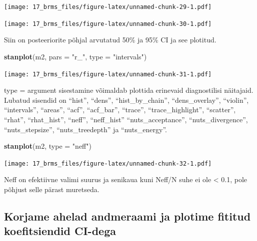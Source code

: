 \documentclass[]{book}
\newenvironment{Shaded}{\begin{snugshade}}{\end{snugshade}}
\newcommand{\DataTypeTok}[1]{\textcolor[rgb]{0.13,0.29,0.53}{#1}}
\newcommand{\KeywordTok}[1]{\textcolor[rgb]{0.13,0.29,0.53}{\textbf{#1}}}
\newcommand{\NormalTok}[1]{#1}
\newcommand{\OperatorTok}[1]{\textcolor[rgb]{0.81,0.36,0.00}{\textbf{#1}}}
\newcommand{\StringTok}[1]{\textcolor[rgb]{0.31,0.60,0.02}{#1}}
\begin{document}
\texttt{[image: 17\_brms\_files/figure-latex/unnamed-chunk-29-1.pdf]}

\begin{Shaded}
\end{Shaded}

\texttt{[image: 17\_brms\_files/figure-latex/unnamed-chunk-30-1.pdf]}

Siin on posteeriorite põhjal arvutatud 50\% ja 95\% CI ja see plotitud.

\begin{Shaded}
\begin{Highlighting}[]
\KeywordTok{stanplot}\NormalTok{(m2, }\DataTypeTok{pars =} \StringTok{"r_"}\NormalTok{, }\DataTypeTok{type =} \StringTok{"intervals"}\NormalTok{)}
\end{Highlighting}
\end{Shaded}

\texttt{[image: 17\_brms\_files/figure-latex/unnamed-chunk-31-1.pdf]}

type = argument sisestamine võimaldab plottida erinevaid diagnostilisi näitajaid. Lubatud sisendid on ``hist'', ``dens'', ``hist\_by\_chain'', ``dens\_overlay'', ``violin'', ``intervals'', ``areas'', ``acf'', ``acf\_bar'', ``trace'', ``trace\_highlight'', ``scatter'', ``rhat'', ``rhat\_hist'', ``neff'', ``neff\_hist'' ``nuts\_acceptance'', ``nuts\_divergence'', ``nuts\_stepsize'', ``nuts\_treedepth'' ja ``nuts\_energy''.

\begin{Shaded}
\begin{Highlighting}[]
\KeywordTok{stanplot}\NormalTok{(m2, }\DataTypeTok{type =} \StringTok{"neff"}\NormalTok{)}
\end{Highlighting}
\end{Shaded}

\texttt{[image: 17\_brms\_files/figure-latex/unnamed-chunk-32-1.pdf]}

Neff on efektiivne valimi suurus ja senikaua kuni Neff/N suhe ei ole \textless{} 0.1, pole põhjust selle pärast muretseda.

\hypertarget{korjame-ahelad-andmeraami-ja-plotime-fititud-koefitsiendid-ci-dega}{%
\subsection{Korjame ahelad andmeraami ja plotime fititud koefitsiendid CI-dega}\label{korjame-ahelad-andmeraami-ja-plotime-fititud-koefitsiendid-ci-dega}}
\end{document}
